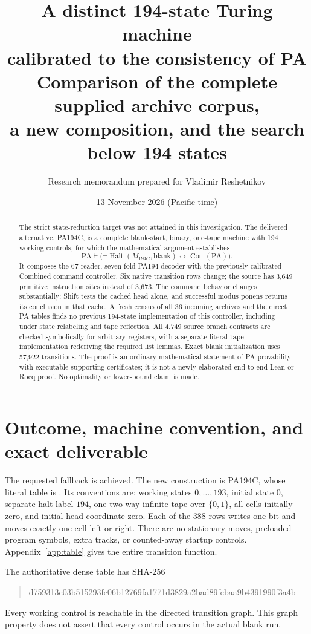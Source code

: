 \documentclass[11pt]{article}
\title{\textbf{A distinct 194-state Turing machine\texorpdfstring{\\}{ }calibrated to the consistency of PA}\\[0.5em]\large Comparison of the complete supplied archive corpus,\\a new composition, and the search below 194 states}
\author{Research memorandum prepared for Vladimir Reshetnikov}
\date{13 November 2026 (Pacific time)}
\newcommand{\PA}{\mathrm{PA}}
\newcommand{\Con}{\operatorname{Con}}
\newcommand{\Halt}{\operatorname{Halt}}
\newcommand{\file}[1]{\texttt{\detokenize{#1}}}
\newcommand{\MC}{M_{194C}}
\theoremstyle{definition}
\theoremstyle{remark}
\begin{document}
\maketitle
\begin{abstract}
The strict state-reduction target was not attained in this investigation.
The delivered alternative, PA194C, is a complete blank-start, binary,
one-tape machine with 194 working controls, for which the mathematical
argument establishes
\[
 \PA\vdash\bigl(\neg\Halt(\MC,\mathrm{blank})\leftrightarrow\Con(\PA)\bigr).
\]
It composes the 67-reader, seven-fold PA194 decoder with the previously
calibrated Combined command controller. Six native transition rows change;
the source has 3,649 primitive instruction sites instead of 3,673.
The command behavior changes substantially: Shift tests the cached head
alone, and successful modus ponens returns its conclusion in that cache.
A fresh census of all 36 incoming archives and the direct PA tables finds
no previous 194-state implementation of this controller, including under
state relabeling and tape reflection. All 4,749 source branch contracts
are checked symbolically for arbitrary registers, with a separate literal-tape
implementation rederiving the required list lemmas. Exact blank initialization
uses 57,922 transitions. The proof is an ordinary mathematical statement of
PA-provability with executable supporting certificates; it is not a newly
elaborated end-to-end Lean or Rocq proof. No optimality or lower-bound claim
is made.
\end{abstract}
\setcounter{tocdepth}{1}
\tableofcontents
\newpage

\section{Outcome, machine convention, and exact deliverable}

The requested fallback is achieved. The new construction is PA194C, whose
literal table is \file{construction/output/pa194C.tm}. Its conventions are:
working states $0,\ldots,193$, initial state $0$, separate halt label $194$,
one two-way infinite tape over $\{0,1\}$, all cells initially zero, and
initial head coordinate zero. Each of the 388 rows writes one bit and
moves exactly one cell left or right. There are no stationary moves,
preloaded program symbols, extra tracks, or counted-away startup controls.
Appendix~\ref{app:table} gives the entire transition function.

The authoritative dense table has SHA-256
\begin{quote}\small\ttfamily
 d759313c03b515293fe06b12769fa1771d3829a2bad89febaa9b4391990f3a4b
\end{quote}
Every working control is reachable
in the directed transition graph. This graph property does not assert
that every control occurs in the actual blank run.
\end{document}
